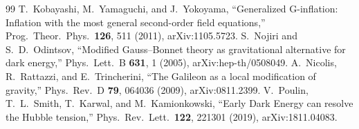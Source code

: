 \documentclass[12pt,a4paper]{article}
\theoremstyle{plain}
\begin{document}
\begin{thebibliography}{99}
  T.~Kobayashi, M.~Yamaguchi, and J.~Yokoyama,
  ``Generalized G-inflation: Inflation with the most general second-order
    field equations,''
  Prog.\ Theor.\ Phys.\ \textbf{126}, 511 (2011), arXiv:1105.5723.
  S.~Nojiri and S.~D.~Odintsov,
  ``Modified Gauss--Bonnet theory as gravitational alternative for dark
    energy,''
  Phys.\ Lett.\ B \textbf{631}, 1 (2005), arXiv:hep-th/0508049.
  A.~Nicolis, R.~Rattazzi, and E.~Trincherini,
  ``The Galileon as a local modification of gravity,''
  Phys.\ Rev.\ D \textbf{79}, 064036 (2009), arXiv:0811.2399.
  V.~Poulin, T.~L.~Smith, T.~Karwal, and M.~Kamionkowski,
  ``Early Dark Energy can resolve the Hubble tension,''
  Phys.\ Rev.\ Lett.\ \textbf{122}, 221301 (2019), arXiv:1811.04083.
\end{thebibliography}
\end{document}
